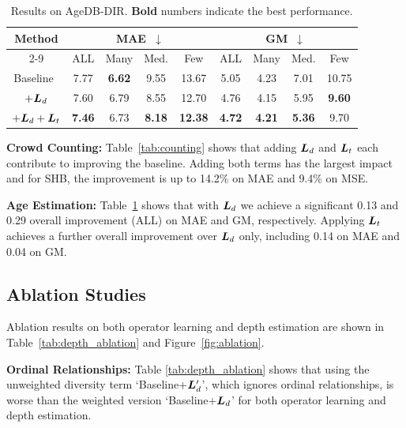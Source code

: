 \documentclass{article} %
\newcommand{\AY}[1]{{\color{purple} {\bf (AY: #1)}}}
\begin{document}
\begin{table}[t]
	\caption{Results on AgeDB-DIR. 
	\textbf{Bold} numbers indicate the best performance.
	}
	\label{tab:age}
	\centering
		\begin{tabular}{c|cccc|cccc}
			\hline
			\multirow{2}[0]{*}{Method} & \multicolumn{4}{c|}{MAE~$\downarrow$} & \multicolumn{4}{c}{GM~$\downarrow$}  \\
 			\cline{2-9}
 			
			& ALL & Many & Med. & Few & ALL & Many & Med. & Few\\
			\hline	Baseline~\citep{yang2021delving} & 7.77 & \textbf{6.62} & 9.55 & 13.67 & 5.05 & 4.23 & 7.01 & 10.75 \\
			$+ {\bm{L}}_d$ & 7.60 & 6.79 & 8.55 & 12.70 & 4.76 & 4.15 & 5.95 & \textbf{9.60} \\
			$+ {\bm{L}}_d + {\bm{L}}_t$  & \textbf{7.46} & 6.73 & \textbf{8.18} & \textbf{12.38} & \textbf{4.72} & \textbf{4.21} & \textbf{5.36} & 9.70 \\
			\hline
		\end{tabular}
\end{table}



\textbf{Crowd Counting:} Table~\ref{tab:counting} shows that adding ${\bm{L}}_d$ and ${\bm{L}}_t$ each contribute to improving the baseline.  Adding both terms has the largest impact and for SHB, the improvement is up to 14.2\% on MAE and 9.4\% on MSE.  

\textbf{Age Estimation:}
Table~\ref{tab:age} shows that with ${\bm{L}}_d$ we achieve a significant 0.13 and 0.29 overall improvement (\ie ALL) on MAE and GM, %
respectively. Applying ${\bm{L}}_t$ achieves a further overall improvement over ${\bm{L}}_d$ only, including 0.14 on MAE and 0.04 on GM.

\subsection{Ablation Studies}
Ablation results on both operator learning and depth estimation are shown in Table~\ref{tab:depth_ablation} and Figure~\ref{fig:ablation}. 

\textbf{Ordinal Relationships:} Table \ref{tab:depth_ablation} shows that using the unweighted diversity term `Baseline+${\bm{L}}'_d$', which ignores ordinal relationships, is worse than the weighted version `Baseline+${\bm{L}}_d$' for both operator learning and depth estimation. 
\end{document}
